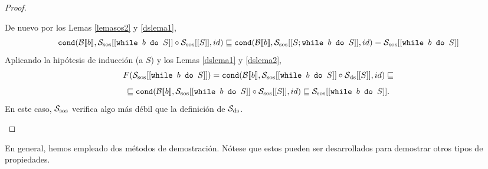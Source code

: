 \begin{proof}
\begin{itemize}
    De nuevo por los Lemas \ref{lemasos2} y \ref{dslema1},
    $$\texttt{cond}(\mathcal{B}[\![b]\!], \mathcal{S}_{\mathrm{sos}}[[\texttt{while }b\texttt{ do }S]]\circ \mathcal{S}_{\mathrm{sos}}[[S]], id) \sqsubseteq \texttt{cond}(\mathcal{B}[\![b]\!], \mathcal{S}_{\mathrm{sos}}[[S; \texttt{while }b\texttt{ do }S]], id) =\mathcal{S}_{\mathrm{sos}}[[\texttt{while }b\texttt{ do }S]]$$
    Aplicando la hipótesis de inducción (a $S$) y los Lemas \ref{dslema1} y \ref{dslema2}, 
    $$F(\mathcal{S}_{\mathrm{sos}}[[\texttt{while }b\texttt{ do }S]]) = \texttt{cond}(\mathcal{B}[\![b]\!], \mathcal{S}_{\mathrm{sos}}[[\texttt{while }b\texttt{ do }S]]\circ \mathcal{S}_{\mathrm{ds}}[[S]], id) \sqsubseteq$$
    $$\sqsubseteq \texttt{cond}(\mathcal{B}[\![b]\!], \mathcal{S}_{\mathrm{sos}}[[\texttt{while }b\texttt{ do }S]]\circ \mathcal{S}_{\mathrm{sos}}[[S]], id) \sqsubseteq \mathcal{S}_{\mathrm{sos}}[[\texttt{while }b\texttt{ do }S]].$$
    En este caso, $\mathcal{S}_{\mathrm{sos}}$ verifica algo más débil que la definición de $\mathcal{S}_{\mathrm{ds}}$.
\end{itemize}
\end{proof}

En general, hemos empleado dos métodos de demostración. Nótese que estos pueden ser desarrollados para demostrar otros tipos de propiedades.